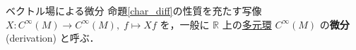 \documentclass[geometry_main]{subfiles}
\begin{document}
\begin{mydef}[label=def.d]{ベクトル場による微分}
	命題\ref{char_diff}の性質を充たす写像 $X \colon C^\infty (M) \to C^\infty (M),\; f \mapsto Xf$ を，一般に $\mathbb{R}$ 上の\hyperref[ax.alg]{多元環} $C^\infty (M)$ の\textbf{微分} (derivation) と呼ぶ．
\end{mydef}





\end{document}
